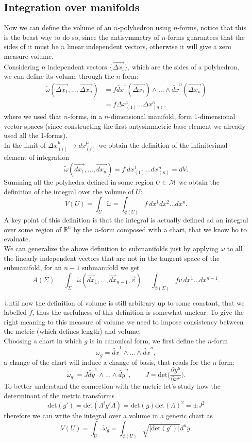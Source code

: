 \subsection{Integration over manifolds}
Now we can define the volume of an $n$-polyhedron using $n$-forms, notice that this is the beast way to do so, since the antisymmetry of $n$-forms guarantees that the sides of it must be $n$ linear independent vectors, otherwise it will give  a zero measure volume.\\
Considering $n$ independent vectors $\{\vec{\Delta x_i}\}$, which are the sides of a polyhedron, we can define its volume through the $n$-form:
\begin{align*}
    \tilde{\omega}(\vec{\Delta x_1},\dots,\vec{\Delta x_n})&=f \tilde{dx}^{1}(\vec{\Delta x_1})\wedge\dots\wedge\tilde{dx}^{n}(\vec{\Delta x_n})\\&=f\Delta x^1_{(1)}\dots\Delta x^n_{(n)},
\end{align*}
where we used that $n$-forms, in a $n$-dimensional manifold, form 1-dimensional vector spaces (since constructing the first antysimmetric base element we already used all the 1-forms). \\
In the limit of $\Delta x_{(i)}^\mu\rightarrow dx^\mu_{(i)}$ we obtain the definition of the infinitesimal element of integration$$\tilde{\omega}(\vec{d x_1},\dots,\vec{d x_n})= f\ d x^1_{(1)}\dots d x^n_{(n)}=dV.$$
Summing all the polyhedra defined in some region $U\in\mathcal{M}$ we obtain the definition of the integral over the volume of $U$:
$$\boxed{V(U)=\int_U\tilde{\omega}=\int_{\phi(U)}f\ dx^1dx^2\dots dx^n}.$$
A key point of this definition is that the integral is actually defined ad an integral over some region of $\mathbb{R}^n$ by the $n$-form composed with a chart, that we know ho to evaluate.\\

We can generalize the above definition to submanifolds just by applying $\tilde\omega$ to all the linearly independent vectors that are not in the tangent space of the submanifold, for an $n-1$ submanifold we get$$A(\Sigma)=\int_\Sigma\tilde{\omega}(\vec{dx}_1,\dots,\vec{dx}_{n-1},\vec {v})=\int_{\phi(\Sigma)}fv\ dx^1\dots dx^{n-1}.$$ 

Until now the definition of volume is still arbitrary up to some constant, that we labelled $f$, thus the usefulness of this definition is somewhat unclear. To give the right meaning to this measure of volume we need to impose consistency between the metric (which defines length) and volume.\\
Choosing a chart in which $g$ is in canonical form, we first define the $n$-form$$\tilde\omega_g=\tilde{dx}^{1}\wedge\dots\wedge\tilde{dx}^{n},$$ a change of the chart will induce a change of basis, that reads for the $n$-form:
$$\tilde\omega_{g'}=J\tilde{dy}^{1}\wedge\dots\wedge\tilde{dy}^{n},\qquad J=\text{det}\bigg(\frac{\partial y^\mu}{\partial x^\nu}\bigg).$$
To better understand the connection with the metric let's study how the determinant of the metric transforms
$$\text{det}(g')=\text{det}(\Lambda^t g'\Lambda)=\text{det}(g) \text{det}(\Lambda)^2=\pm J^2$$
therefore we can write the integral over a volume in a generic chart as 
$$\boxed{V(U)=\int_U\tilde{\omega}_g=\int_{\phi(U)}\sqrt{|\text{det}(g')|}d^ny}.$$